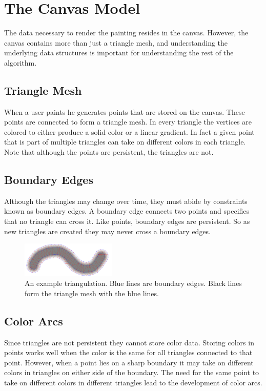 \documentclass[review]{acmsiggraph}
\begin{document}
\section{The Canvas Model}
The data necessary to render the painting resides in the canvas. However, the canvas contains more than just
a triangle mesh, and understanding the underlying data structures is important for 
understanding the rest of the algorithm.

\subsection{Triangle Mesh}
When a user paints he generates points that are stored on the canvas. These points are
connected to form a triangle mesh. In every triangle the vertices are colored to either
produce a solid color or a linear gradient. In fact a given point that is part of
multiple triangles can take on different colors in each triangle. Note that although
the points are persistent, the triangles are not.

\subsection{Boundary Edges}
Although the triangles may change over time, they must abide by constraints known as
boundary edges. A boundary edge connects two points and specifies that no triangle
can cross it. Like points, boundary edges are persistent. So as new triangles are created they
may never cross a boundary edges.


\begin{figure}
    \centering
        \includegraphics[width=0.4\textwidth]{images/stroke}
    \caption{An example triangulation. Blue lines are boundary edges. Black lines form the triangle
    mesh with the blue lines.}
\end{figure}

\subsection{Color Arcs}
Since triangles are not persistent they cannot store color data.
Storing colors in points works well when the color is the same for all triangles connected
to that point. However, when a point lies on a sharp boundary it may take on different colors in
triangles on either side of the boundary. The need for the same point to take on different
colors in different triangles lead to the development of color arcs.
\end{document}
